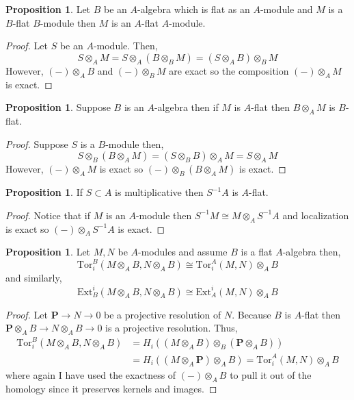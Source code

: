\documentclass[12pt]{article}
\newcommand{\Tor}[4]{\mathrm{Tor}^{#1}_{#2} \left( #3, #4 \right)}
\newcommand{\Ext}[4]{\mathrm{Ext}^{#1}_{#2} \left( #3, #4 \right)}
\theoremstyle{remark}
\theoremstyle{definition}
\newtheorem{proposition}[theorem]{Proposition}
\begin{document}
\begin{proposition}
Let $B$ be an $A$-algebra which is flat as an $A$-module and $M$ is a $B$-flat $B$-module then $M$ is an $A$-flat $A$-module.
\end{proposition}

\begin{proof}
Let $S$ be an $A$-module. Then,
\[ S \otimes_A M = S \otimes_A (B \otimes_B M) = (S \otimes_A B) \otimes_B M \]
However, $(-) \otimes_A B$ and $(-) \otimes_B M$ are exact so the composition $(-) \otimes_A M$ is exact. 
\end{proof}


\begin{proposition}
Suppose $B$ is an $A$-algebra then if $M$ is $A$-flat then $B \otimes_A M$ is $B$-flat.
\end{proposition}

\begin{proof}
Suppose $S$ is a $B$-module then,
\[ S \otimes_B (B \otimes_A M) = (S \otimes_B B) \otimes_A M = S \otimes_A M \]
However, $(-) \otimes_A M$ is exact so $(-) \otimes_B (B \otimes_A M)$ is exact. 
\end{proof}

\begin{proposition}
If $S \subset A$ is multiplicative then $S^{-1} A$ is $A$-flat.
\end{proposition}

\begin{proof}
Notice that if $M$ is an $A$-module then $S^{-1} M \cong M \otimes_A S^{-1} A$ and localization is exact so $(-) \otimes_A S^{-1} A$ is exact.
\end{proof}

\begin{proposition}
Let $M,N$ be $A$-modules and assume $B$ is a flat $A$-algebra then,
\[ \Tor{B}{i}{M \otimes_A B}{N \otimes_A B} \cong \Tor{A}{i}{M}{N} \otimes_A B \]
and similarly,
\[ \Ext{i}{B}{M \otimes_A B}{N \otimes_A B} \cong \Ext{i}{A}{M}{N} \otimes_A B \]
\end{proposition}

\begin{proof}
Let $\mathbf{P} \to N \to 0$ be a projective resolution of $N$. Because $B$ is $A$-flat then $\mathbf{P} \otimes_A B \to N \otimes_A B \to 0$ is a projective resolution. Thus,
\begin{align*}
\Tor{B}{i}{M \otimes_A B}{N \otimes_A B} & = H_i((M \otimes_A B) \otimes_B (\mathbf{P} \otimes_A B))
\\
& = H_i((M \otimes_A \mathbf{P}) \otimes_A B) = \Tor{A}{i}{M}{N} \otimes_A B 
\end{align*} 
where again I have used the exactness of $(-) \otimes_A B$ to pull it out of the homology since it preserves kernels and images. 
\end{proof}
\end{document}
